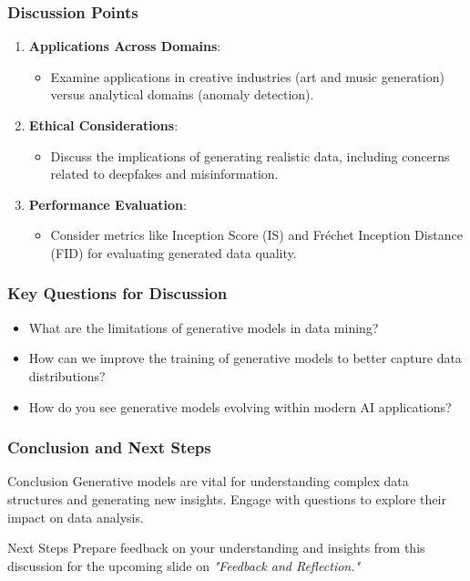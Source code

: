 \documentclass[aspectratio=169]{beamer}
\begin{document}
\begin{frame}[fragile]
    \frametitle{Discussion Points}
    \begin{enumerate}
        \item \textbf{Applications Across Domains}:
            \begin{itemize}
                \item Examine applications in creative industries (art and music generation) versus analytical domains (anomaly detection).
            \end{itemize}
        \item \textbf{Ethical Considerations}:
            \begin{itemize}
                \item Discuss the implications of generating realistic data, including concerns related to deepfakes and misinformation.
            \end{itemize}
        \item \textbf{Performance Evaluation}:
            \begin{itemize}
                \item Consider metrics like Inception Score (IS) and Fréchet Inception Distance (FID) for evaluating generated data quality.
            \end{itemize}
    \end{enumerate}
\end{frame}

\begin{frame}[fragile]
    \frametitle{Key Questions for Discussion}
    \begin{itemize}
        \item What are the limitations of generative models in data mining?
        \item How can we improve the training of generative models to better capture data distributions?
        \item How do you see generative models evolving within modern AI applications?
    \end{itemize}
\end{frame}

\begin{frame}[fragile]
    \frametitle{Conclusion and Next Steps}
    \begin{block}{Conclusion}
        Generative models are vital for understanding complex data structures and generating new insights. Engage with questions to explore their impact on data analysis.
    \end{block}
    \begin{block}{Next Steps}
        Prepare feedback on your understanding and insights from this discussion for the upcoming slide on \textit{"Feedback and Reflection."}
    \end{block}
\end{frame}
\end{document}
